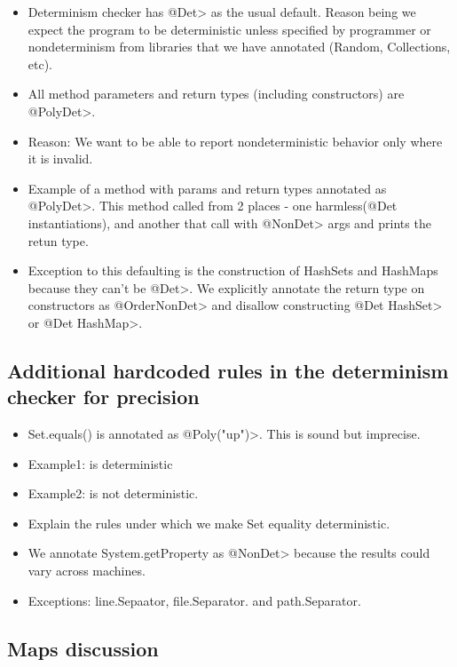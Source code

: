 \begin{itemize}
	\item Determinism checker has \<@Det> as the usual default. Reason being we expect the program to be 
	deterministic unless specified by programmer or nondeterminism from libraries that we have annotated (Random, Collections, etc).
	\item All method parameters and return types (including constructors) are \<@PolyDet>.
	\item Reason: We want to be able to report nondeterministic behavior only where it is invalid.
	\item Example of a method with params and return types annotated as \<@PolyDet>.
	This method called from 2 places - one harmless(@Det instantiations), and another that call with \<@NonDet> args and prints the retun type.
	\item Exception to this defaulting is the construction of HashSets and HashMaps because they can't be \<@Det>.
	We explicitly annotate the return type on constructors as
        \<@OrderNonDet> and disallow constructing \<@Det HashSet> or \<@Det
        HashMap>.
\end{itemize}

\subsection{Additional hardcoded rules in the determinism checker  for precision}

\begin{itemize}
	\item Set.equals() is annotated as \<@Poly("up")>. This is sound but imprecise.
	\item Example1:  is deterministic
	\item Example2:  is not deterministic.
	\item Explain the rules under which we make Set equality deterministic.
	\item We annotate System.getProperty as \<@NonDet> because the results could vary across machines.
	\item Exceptions: line.Sepaator, file.Separator. and path.Separator.
\end{itemize}

\subsection{Maps discussion}

